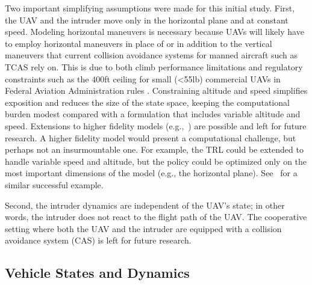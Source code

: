 Two important simplifying assumptions were made for this initial study. First, the UAV and the intruder move only in the horizontal plane and at constant speed. Modeling horizontal maneuvers is necessary because UAVs will likely have to employ horizontal maneuvers in place of or in addition to the vertical maneuvers that current collision avoidance systems for manned aircraft such as TCAS rely on. This is due to both climb performance limitations and regulatory constraints such as the \num{400}\si{ft} ceiling for small (\num{<55}\si{lb}) commercial UAVs in Federal Aviation Administration rules \cite{faa2018small}. Constraining altitude and speed simplifies exposition and reduces the size of the state space, keeping the computational burden modest compared with a formulation that includes variable altitude and speed. Extensions to higher fidelity models (e.g.,~\cite{MJK-MWME-LPE-JKK-JDG:10}) are possible and left for future research.
A higher fidelity model would present a computational challenge, but perhaps not an insurmountable one.
For example, the TRL could be extended to handle variable speed and altitude, but the policy could be optimized only on the most important dimensions of the model (e.g., the horizontal plane). See~\cite{MJK-JPC-PPR:10} for a similar successful example.

Second, the intruder dynamics are independent of the UAV's state; in other words, the intruder does not react to the flight path of the UAV. The cooperative setting where both the UAV and the intruder are equipped with a collision avoidance system (CAS) \cite{EJR:14,CT-GJP-SSS:98,MJK-JPC:11} is left for future research.

\subsection{Vehicle States and Dynamics}\label{sec:veh}

